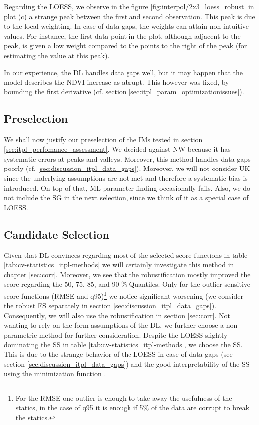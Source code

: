 {{        Regarding the LOESS, we observe in the figure \ref{fig:interpol/2x3_loess_robust} in plot (c) a strange peak between the first and second observation. This peak is due to the local weighting. In case of data gaps, the weights can attain non-intuitive values. For instance, the first data point in the plot, although adjacent to the peak, is given a low weight compared to the points to the right of the peak (for estimating the value at this peak).

        In our experience, the DL handles data gaps well, but it may happen that the model describes the NDVI increase as abrupt. This however was fixed, by bounding the first derivative (cf. section \ref{sec:itpl_param_optimizationissues}).
    }

    \subsection{Preselection}{\label{sec:itpl_preselection}
        We shall now justify our preselection of the {{IM}}s tested in section \ref{sec:itpl_perfomance_assessment}. 
        We decided against NW because it has systematic errors at peaks and valleys. Moreover, this method handles data gaps poorly (cf. \ref{sec:discussion_itpl_data_gaps}). 
        Moreover, we will not consider UK since the underlying assumptions are not met and therefore a systematic bias is introduced. On top of that, ML parameter finding occasionally fails.
        Also, we do not include the SG in the next selection, since we think of it as a special case of LOESS.
    }

    \subsection{Candidate Selection}{\label{sec:itpl_candiate_selection}
        Given that DL convinces regarding most of the selected score functions in table \ref{tab:cv-statistics_itpl-methods} we will certainly investigate this method in chapter \ref{sec:corr}. Moreover, we see that the robustification mostly improved the score regarding the 50, 75, 85, and 90 \% Quantiles. Only for the outlier-sensitive score functions (RMSE and q95)\footnote{For the RMSE one outlier is enough to take away the usefulness of the statics, in the case of q95 it is enough if 5\% of the data are corrupt to break the statics.} we notice significant worsening (we consider the robust FS separately in section \ref{sec:discussion_itpl_data_gaps}). Consequently, we will also use the robustification in section \ref{sec:corr}.
        Not wanting to rely on the form assumptions of the DL, we further choose a non-parametric method for further consideration. Despite the LOESS slightly dominating the SS in table \ref{tab:cv-statistics_itpl-methods}, we choose the SS. This is due to the strange behavior of the LOESS in case of data gaps (see section \ref{sec:discussion_itpl_data_gaps}) and the good interpretability of the SS using the minimization function .
    }


}


